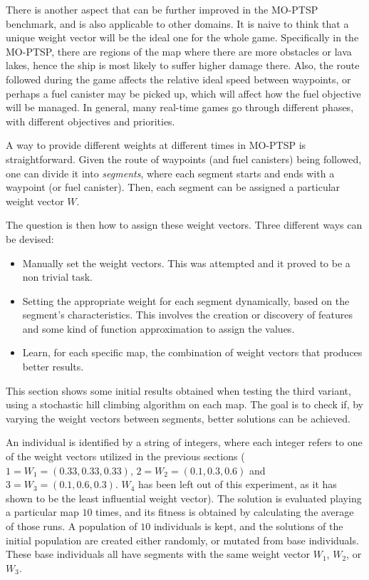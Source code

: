 \documentclass[journal]{IEEEtran}
\begin{document}
There is another aspect that can be further improved in the MO-PTSP benchmark, and is also applicable to other domains. It is naive to think that a unique weight vector will be the ideal one for the whole game. Specifically in the MO-PTSP, there are regions of the map where there are more obstacles or lava lakes, hence the ship is most likely to suffer higher damage there. Also, the route followed during the game affects the relative ideal speed between waypoints, or perhaps a fuel canister may be picked up, which will affect how the fuel objective will be managed. In general, many real-time games go through different phases, with different objectives and priorities.

A way to provide different weights at different times in MO-PTSP is straightforward. Given the route of waypoints (and fuel canisters) being followed, one can divide it into \textit{segments}, where each segment starts and ends with a waypoint (or fuel canister). Then, each segment can be assigned a particular weight vector $W$. 

The question is then how to assign these weight vectors. Three different ways can be devised:

\begin{itemize}
\item Manually set the weight vectors. This was attempted and it proved to be a non trivial task.
\item Setting the appropriate weight for each segment dynamically, based on the segment's characteristics. This involves the creation or discovery of features and some kind of function approximation to assign the values. 
\item Learn, for each specific map, the combination of weight vectors that produces better results.
\end{itemize}

This section shows some initial results obtained when testing the third variant, using a stochastic hill climbing algorithm on each map. The goal is to check if, by varying the weight vectors between segments, better solutions can be achieved. 

An individual is identified by a string of integers, where each integer refers to one of the weight vectors utilized in the previous sections ( $1 = W_1 = (0.33,0.33,0.33)$, $2 = W_2 = (0.1,0.3,0.6)$ and $3 = W_3 = (0.1,0.6,0.3)$. $W_4$ has been left out of this experiment, as it has shown to be the least influential weight vector). The solution is evaluated playing a particular map $10$ times, and its fitness is obtained by calculating the average of those runs. A population of $10$ individuals is kept, and the solutions of the initial population are created either randomly, or mutated from base individuals. These base individuals all have segments with the same weight vector $W_1$, $W_2$, or $W_3$. 
\end{document}
